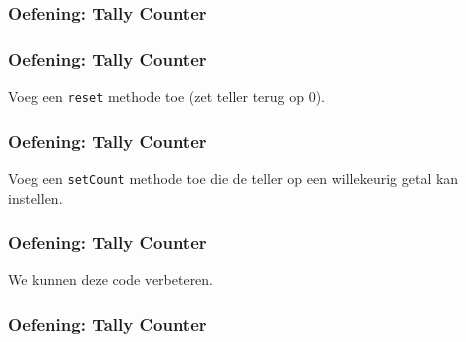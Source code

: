 \begin{frame}
  \frametitle{Oefening: Tally Counter}
\end{frame}

\begin{frame}
  \frametitle{Oefening: Tally Counter}
  Voeg een {\tt reset} methode toe (zet teller terug op 0).
\end{frame}

\begin{frame}
  \frametitle{Oefening: Tally Counter}
  Voeg een {\tt setCount} methode toe die de teller op een willekeurig getal kan instellen.
\end{frame}

\begin{frame}
  \frametitle{Oefening: Tally Counter}
  We kunnen deze code verbeteren.
\end{frame}

\begin{frame}
  \frametitle{Oefening: Tally Counter}
\end{frame}



